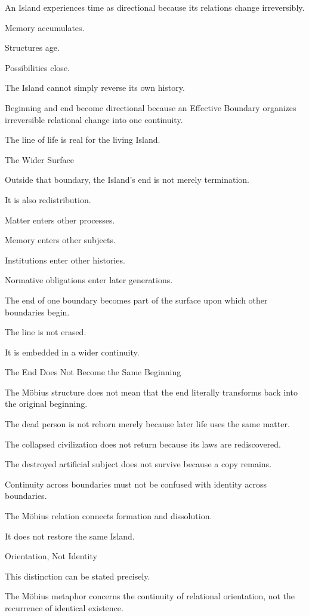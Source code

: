 An Island experiences time as directional because its relations change irreversibly.

Memory accumulates.

Structures age.

Possibilities close.

The Island cannot simply reverse its own history.

Beginning and end become directional because an Effective Boundary organizes irreversible relational change into one continuity.

The line of life is real for the living Island.

The Wider Surface

Outside that boundary, the Island’s end is not merely termination.

It is also redistribution.

Matter enters other processes.

Memory enters other subjects.

Institutions enter other histories.

Normative obligations enter later generations.

The end of one boundary becomes part of the surface upon which other boundaries begin.

The line is not erased.

It is embedded in a wider continuity.

The End Does Not Become the Same Beginning

The Möbius structure does not mean that the end literally transforms back into the original beginning.

The dead person is not reborn merely because later life uses the same matter.

The collapsed civilization does not return because its laws are rediscovered.

The destroyed artificial subject does not survive because a copy remains.

Continuity across boundaries must not be confused with identity across boundaries.

The Möbius relation connects formation and dissolution.

It does not restore the same Island.

Orientation, Not Identity

This distinction can be stated precisely.

The Möbius metaphor concerns the continuity of relational orientation, not the recurrence of identical existence.

